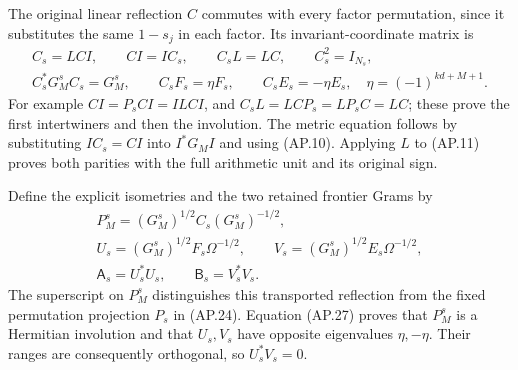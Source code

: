 The original linear reflection \(C\) commutes with every factor
permutation, since it substitutes the same \(1-s_j\) in each
factor.  Its invariant-coordinate matrix is
\[
 \begin{gathered}
 C_s=LCI,\qquad CI=IC_s,\qquad C_sL=LC,\qquad C_s^2=I_{N_s},\\
 C_s^*G_M^sC_s=G_M^s,\qquad
 C_sF_s=\eta F_s,\qquad C_sE_s=-\eta E_s,
 \quad\eta=(-1)^{kd+M+1}.
 \end{gathered}                                                \tag{AP.27}
\]
For example \(CI=P_sCI=ILCI\), and
\(C_sL=LCP_s=LP_sC=LC\); these prove the first
intertwiners and then the involution.  The metric equation follows
by substituting \(IC_s=CI\) into \(I^*G_MI\) and
using (AP.10).  Applying \(L\) to (AP.11) proves both
parities with the full arithmetic unit and its original sign.

Define the explicit isometries and the two retained frontier Grams by
\[
 \begin{gathered}
 P_M^s=(G_M^s)^{1/2}C_s(G_M^s)^{-1/2},\\
 U_s=(G_M^s)^{1/2}F_s\Omega^{-1/2},\qquad
 V_s=(G_M^s)^{1/2}E_s\Omega^{-1/2},\\
 \mathsf A_s=U_s^*U_s,\qquad \mathsf B_s=V_s^*V_s.
 \end{gathered}                                                \tag{AP.28}
\]
The superscript on \(P_M^s\) distinguishes this transported
reflection from the fixed permutation projection \(P_s\) in
(AP.24).  Equation (AP.27) proves that \(P_M^s\) is a
Hermitian involution and that \(U_s,V_s\) have opposite
eigenvalues \(\eta,-\eta\).  Their ranges are consequently
orthogonal, so \(U_s^*V_s=0\).


